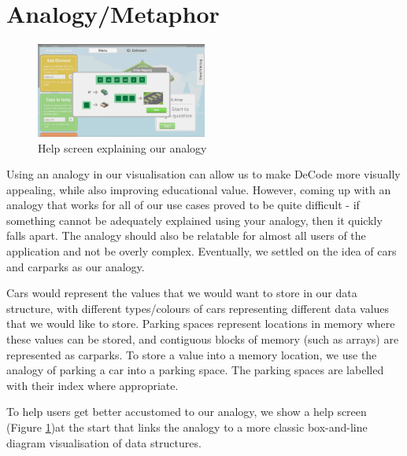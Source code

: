 \documentclass[11pt]{article}
\begin{document}
\section{Analogy/Metaphor}
\begin{figure}
  \centering
  \includegraphics[width=0.5\textwidth]{images/helpanalogy.png}
\caption{Help screen explaining our analogy}
\label{fig:helpanalogy}
\end{figure}
Using an analogy in our visualisation can allow us to make DeCode more visually appealing, while also improving educational value\cite{Park}\cite{vegh2}. However, coming up with an analogy that works for all of our use cases proved to be quite difficult - if something cannot be adequately explained using your analogy, then it quickly falls apart. The analogy should also be relatable for almost all users of the application and not be overly complex. Eventually, we settled on the idea of cars and carparks as our analogy.\par
Cars would represent the values that we would want to store in our data structure, with different types/colours of cars representing different data values that we would like to store. Parking spaces represent locations in memory where these values can be stored, and contiguous blocks of memory (such as arrays) are represented as carparks. To store a value into a memory location, we use the analogy of parking a car into a parking space. The parking spaces are labelled with their index where appropriate.\par
To help users get better accustomed to our analogy, we show a help screen (Figure \ref{fig:helpanalogy})at the start that links the analogy to a more classic box-and-line diagram visualisation of data structures.
\end{document}
